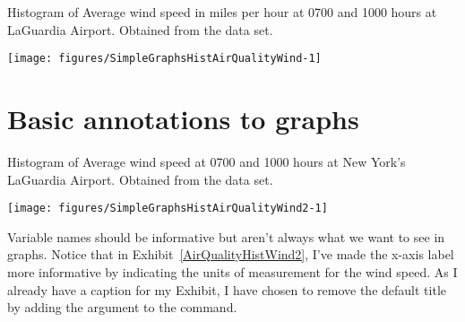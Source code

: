 \begin{exhibit} 
\begin{center} 
\caption{Histogram of Average wind speed in miles per hour at 0700 and 1000 hours at LaGuardia Airport. Obtained from the  data set.} 
\label{AirQualityHistWind} 
\begin{knitrout}
\color{fgcolor}\begin{kframe}
\begin{alltt}
\hlstd{> }
\end{alltt}
\end{kframe}
\end{knitrout}
\texttt{[image: figures/SimpleGraphsHistAirQualityWind-1]} 

\end{center} 
\end{exhibit} 
 
\section{Basic annotations to graphs} 
 
\begin{exhibit} 
\begin{center} 
\caption{Histogram of Average wind speed at 0700 and 1000 hours at New York's LaGuardia Airport. Obtained from the  data set.} 
\label{AirQualityHistWind2} 
\begin{knitrout}
\color{fgcolor}\begin{kframe}
\begin{alltt}
\hlstd{> } \hlstd{=}\hlstd{,} \hlstd{=}\hlstd{)}
\end{alltt}
\end{kframe}
\end{knitrout}
\texttt{[image: figures/SimpleGraphsHistAirQualityWind2-1]} 

\end{center} 
\end{exhibit} 
 
Variable names should be informative but aren't always what we want to see in graphs. Notice that in Exhibit~\ref{AirQualityHistWind2}, I've made the x-axis label more informative by indicating the units of measurement for the wind speed. As I already have a caption for my Exhibit, I have chosen to remove the default title by adding the argument  to the  command. 
 
